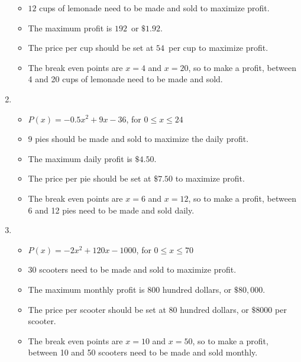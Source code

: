 \begin{enumerate}
\begin{itemize}
\item  $12$ cups of lemonade need to be made and sold to maximize profit.

\item  The maximum profit is $192$\textcent \, or $\$1.92$.

\item  The price per cup should be set at $54$\textcent \, per cup to maximize profit.

\item  The break even points are $x=4$ and $x=20$, so to make a profit, between 4 and 20 cups of lemonade need to be made and sold.


\end{itemize}


\item \begin{itemize}

\item $P(x) = -0.5 x^2+9x-36$, for $0 \leq x \leq 24$

\item  $9$ pies should be made and sold to maximize the daily profit.

\item The maximum daily profit is $\$4.50$.

\item  The price per pie should be set at $\$7.50$ to maximize profit.

\item  The break even points are $x=6$ and $x=12$, so to make a profit, between 6 and 12 pies  need to be made and sold daily.

\end{itemize}

\item \begin{itemize}

\item  $P(x) = -2x^2+120x-1000$, for $0 \leq x \leq 70$

\item  $30$ scooters need to be made and sold to maximize profit.

\item  The maximum monthly profit is $800$ hundred dollars, or $\$80,\!000$.

\item The price per scooter should be set at $80$ hundred dollars, or $\$8000$ per scooter.

\item  The break even points are $x=10$ and $x=50$, so to make a profit, between 10 and 50 scooters  need to be made and sold monthly.

\end{itemize}

\setcounter{HW}{\value{enumi}}
\end{enumerate}

